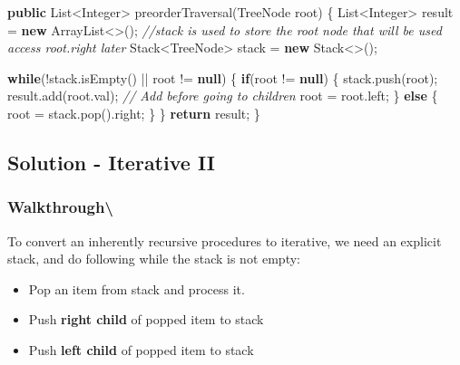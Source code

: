 \documentclass[]{book}
\newenvironment{Shaded}{\begin{snugshade}}{\end{snugshade}}
\newcommand{\BuiltInTok}[1]{#1}
\newcommand{\CommentTok}[1]{\textcolor[rgb]{0.56,0.35,0.01}{\textit{#1}}}
\newcommand{\FunctionTok}[1]{\textcolor[rgb]{0.00,0.00,0.00}{#1}}
\newcommand{\KeywordTok}[1]{\textcolor[rgb]{0.13,0.29,0.53}{\textbf{#1}}}
\newcommand{\NormalTok}[1]{#1}
\providecommand{\tightlist}{%
  \setlength{\itemsep}{0pt}\setlength{\parskip}{0pt}}
\begin{document}
\begin{Shaded}
\begin{Highlighting}[]
\KeywordTok{public} \BuiltInTok{List}\NormalTok{<}\BuiltInTok{Integer}\NormalTok{> }\FunctionTok{preorderTraversal}\NormalTok{(}\BuiltInTok{TreeNode}\NormalTok{ root) \{}
    \BuiltInTok{List}\NormalTok{<}\BuiltInTok{Integer}\NormalTok{> result = }\KeywordTok{new} \BuiltInTok{ArrayList}\NormalTok{<>();}
    \CommentTok{//stack is used to store the root node that will be used access root.right later}
    \BuiltInTok{Stack}\NormalTok{<}\BuiltInTok{TreeNode}\NormalTok{> stack = }\KeywordTok{new} \BuiltInTok{Stack}\NormalTok{<>();}

    \KeywordTok{while}\NormalTok{(!stack.}\FunctionTok{isEmpty}\NormalTok{() || root != }\KeywordTok{null}\NormalTok{) \{}
        \KeywordTok{if}\NormalTok{(root != }\KeywordTok{null}\NormalTok{) \{}
\NormalTok{            stack.}\FunctionTok{push}\NormalTok{(root);}
\NormalTok{            result.}\FunctionTok{add}\NormalTok{(root.}\FunctionTok{val}\NormalTok{); }\CommentTok{// Add before going to children}
\NormalTok{            root = root.}\FunctionTok{left}\NormalTok{;}
\NormalTok{        \} }\KeywordTok{else}\NormalTok{ \{}
\NormalTok{            root = stack.}\FunctionTok{pop}\NormalTok{().}\FunctionTok{right}\NormalTok{;}
\NormalTok{        \}}
\NormalTok{    \}}
    \KeywordTok{return}\NormalTok{ result;}
\NormalTok{\}}
\end{Highlighting}
\end{Shaded}

\hypertarget{solution---iterative-ii}{%
\subsection{Solution - Iterative II}\label{solution---iterative-ii}}

\hypertarget{walkthrough-67}{%
\subsubsection{Walkthrough\textbackslash{}}\label{walkthrough-67}}

To convert an inherently recursive procedures to iterative, we need an explicit stack, and do following
while the stack is not empty:

\begin{itemize}
\tightlist
\item
  Pop an item from stack and process it.
\item
  Push \textbf{right child} of popped item to stack
\item
  Push \textbf{left child} of popped item to stack
\end{itemize}
\end{document}
